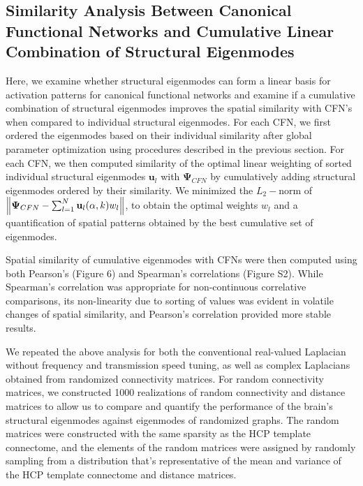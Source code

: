 \documentclass{article}
\begin{document}
\subsection{Similarity Analysis Between Canonical Functional Networks and Cumulative Linear Combination of Structural Eigenmodes}

Here, we examine whether structural eigenmodes can form a linear basis for activation patterns for canonical functional networks and examine if a cumulative combination of  structural eigenmodes improves the spatial similarity with CFN's when compared to individual structural eigenmodes. For each CFN, we first ordered the eigenmodes based on their individual similarity after global parameter optimization using procedures described in the previous section. For each CFN, we then computed similarity of the optimal linear weighting of sorted individual structural eigenmodes $\mathbf{u}_l$ with $\mathbf{\Psi}_{CFN}$ by cumulatively adding structural eigenmodes ordered by their similarity. We minimized the $L_2-\text{norm}$ of $\norm{\mathbf{\Psi}_{CFN}-\sum_{l=1}^{N} \mathbf{u}_{l}(\alpha,k) w_{l}}$, to obtain the optimal weights $w_l$ and a quantification of spatial patterns obtained by the best cumulative set of eigenmodes.

Spatial similarity of cumulative eigenmodes with CFNs were then computed using both Pearson's (Figure 6) and Spearman's correlations (Figure S2). While Spearman's correlation was appropriate for non-continuous correlative comparisons, its non-linearity due to sorting of values was evident in volatile changes of spatial similarity, and Pearson's correlation provided more stable results.


We repeated the above analysis for both the conventional real-valued Laplacian without frequency and transmission speed tuning, as well as complex Laplacians obtained from randomized connectivity matrices. For random connectivity matrices, we constructed 1000 realizations of random connectivity and distance matrices to allow us to compare and quantify the performance of the brain's structural eigenmodes against eigenmodes of randomized graphs. The random matrices were constructed with the same sparsity as the HCP template connectome, and the elements of the random matrices were assigned by randomly sampling from a distribution that's representative of the mean and variance of the HCP template connectome and distance matrices.
\end{document}
